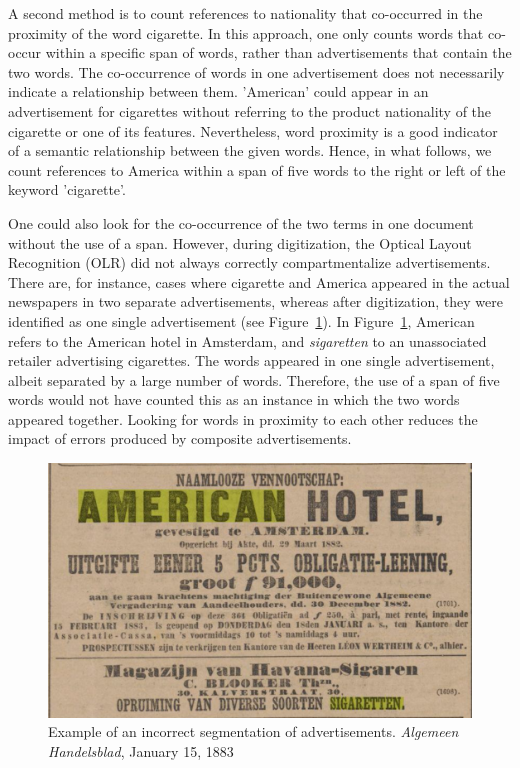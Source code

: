 \documentclass[USenglish]{article}
\begin{document}
A second method is to count references to nationality that co-occurred in the  proximity of the word cigarette. In this approach, one only counts words that co-occur within a specific span of words, rather than advertisements that contain the two words. The co-occurrence of words in one advertisement does not necessarily indicate a relationship between them. 'American' could appear in an advertisement for cigarettes without referring to the product nationality of the cigarette or one of its features. Nevertheless, word proximity is a good indicator of a semantic relationship between the given words. Hence, in what follows, we count references to America within a span of five words to the right or left of the keyword 'cigarette'. 

One could also look for the co-occurrence of the two terms in one document without the use of a span. However, during digitization, the Optical Layout Recognition (OLR) did not always correctly compartmentalize advertisements. There are, for instance, cases where cigarette and America appeared in the actual newspapers in two separate advertisements, whereas after digitization, they were identified as one single advertisement (see Figure~\ref{fig:segmentation}). In Figure~\ref{fig:segmentation}, American refers to the American hotel in Amsterdam, and \textit{sigaretten} to an unassociated retailer advertising cigarettes. The words appeared in one single advertisement, albeit separated by a large number of words. Therefore, the use of a span of five words would not have counted this as an instance in which the two words appeared together. Looking for words in proximity to each other reduces the impact of errors produced by composite advertisements.

\begin{figure}%
  \centering
  \includegraphics[width=.9\textwidth]{figures/segmentation_error}%
  \caption{Example of an incorrect segmentation of advertisements. \textit{Algemeen Handelsblad}, January 15, 1883}%
  \label{fig:segmentation}%
\end{figure}
\end{document}
